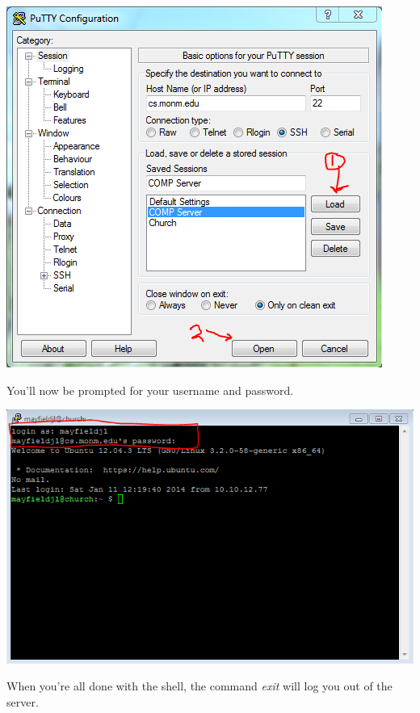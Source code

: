 \documentclass[]{tufte-handout}
\begin{document}
\vspace{.1in}
\begin{center}
\includegraphics[scale=.75]{Putty-LoadAndOpen.png}
\end{center}
\vspace{.1in}

You'll now be prompted for your username and password. 

\vspace{.1in}
\begin{center}
\includegraphics[scale=.75]{Putty-Login.png}
\end{center}
\vspace{.1in}

When you're all done with the shell, the command \textit{exit} will log you out of the server.  
\end{document}
